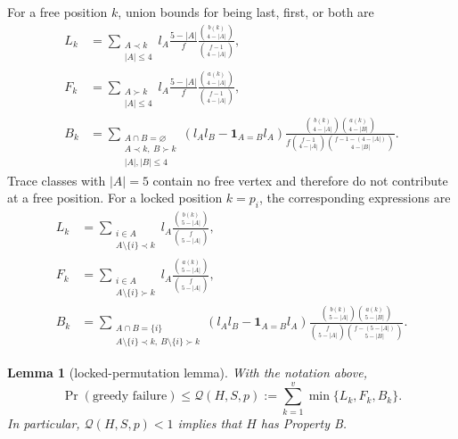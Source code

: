 \documentclass[11pt]{article}
\newtheorem{lemma}[theorem]{Lemma}
\theoremstyle{remark}
\newcommand{\Qlock}{\mathcal{Q}}
\newcommand{\ind}{\mathbf{1}}
\begin{document}
For a free position $k$, union bounds for being last, first, or both are
\begin{align}
L_k&=\sum_{\substack{A\prec k\\|A|\le 4}}l_A\frac{5-|A|}{f}
 \frac{\binom{b(k)}{4-|A|}}{\binom{f-1}{4-|A|}},\label{eq:free-last}\\
F_k&=\sum_{\substack{A\succ k\\|A|\le 4}}l_A\frac{5-|A|}{f}
 \frac{\binom{a(k)}{4-|A|}}{\binom{f-1}{4-|A|}},\label{eq:free-first}\\
B_k&=\sum_{\substack{A\cap B=\varnothing\\A\prec k,\ B\succ k\\
|A|,|B|\le 4}}
\left(l_Al_B-\ind_{A=B}l_A\right)
\frac{\binom{b(k)}{4-|A|}\binom{a(k)}{4-|B|}}
{f\binom{f-1}{4-|A|}\binom{f-1-(4-|A|)}{4-|B|}}.
\label{eq:free-both}
\end{align}
Trace classes with $|A|=5$ contain no free vertex and therefore do not
contribute at a free position.
For a locked position $k=p_i$, the corresponding expressions are
\begin{align}
L_k&=\sum_{\substack{i\in A\\A\setminus\{i\}\prec k}}
l_A\frac{\binom{b(k)}{5-|A|}}{\binom f{5-|A|}},
\label{eq:locked-last}\\
F_k&=\sum_{\substack{i\in A\\A\setminus\{i\}\succ k}}
l_A\frac{\binom{a(k)}{5-|A|}}{\binom f{5-|A|}},
\label{eq:locked-first}\\
B_k&=\sum_{\substack{A\cap B=\{i\}\\
A\setminus\{i\}\prec k,\ B\setminus\{i\}\succ k}}
\left(l_Al_B-\ind_{A=B}l_A\right)
\frac{\binom{b(k)}{5-|A|}\binom{a(k)}{5-|B|}}
{\binom f{5-|A|}\binom{f-(5-|A|)}{5-|B|}}.
\label{eq:locked-both}
\end{align}

\begin{lemma}[locked-permutation lemma]\label{lem:locked}
With the notation above,
\begin{equation}\label{eq:Q}
\Pr(\text{greedy failure})\le
\Qlock(H,S,p):=\sum_{k=1}^{v}\min\{L_k,F_k,B_k\}.
\end{equation}
In particular, $\Qlock(H,S,p)<1$ implies that $H$ has Property B.
\end{lemma}
\end{document}
